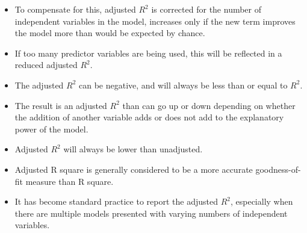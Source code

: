 \documentclass[PredictiveAnalytics101.tex]{subfiles}
\begin{document}
\begin{frame}
	\Large
	\begin{itemize}
		\item To compensate for this, adjusted $R^2$  is corrected for the number of independent variables in the model, increases only if the new term improves the model more than would be expected by chance. 
		\item If too many predictor variables are being used, this will be reflected in a reduced adjusted $R^2$. 
		\item The adjusted $R^2$ can be negative, and will always be less than or equal to $R^2$. 
		\item The result is an adjusted $R^2$ than can go up or down depending on whether the addition of another variable adds or does not add to the explanatory power of the model. \item Adjusted $R^2$ will always be lower than unadjusted.
	\end{itemize}
\end{frame}

\begin{frame}
	\Large
	\begin{itemize}
		\item Adjusted R square is generally considered to be a more accurate goodness-of-fit measure than R square. 
		\item It has become standard practice to report the adjusted $R^2$, especially when there are multiple models presented with varying numbers of independent variables.
	\end{itemize}
\end{frame}
%
%
%
%
%
%
%
\end{document}
